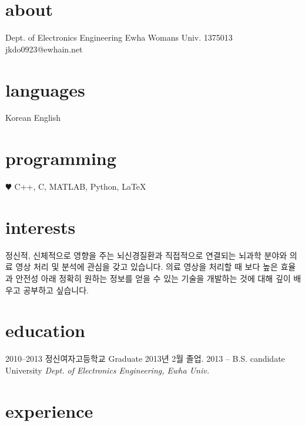 \documentclass[]{friggeri-cv}
\begin{document}


\begin{aside}
  \section{about}
    Dept. of Electronics
    Engineering
    Ewha Womans Univ.
    1375013
    ~
    jkdo0923@ewhain.net    
  \section{languages}
    Korean
    English
  \section{programming}
    {\color{red} $\varheartsuit$} C++, C, MATLAB, Python, \LaTeX{}
\end{aside}

\section{interests}

\hspace{0.3cm} 정신적, 신체적으로 영향을 주는 뇌신경질환과 직접적으로 연결되는 뇌과학 분야와 의료 영상 처리 및 분석에 관심을 갖고 있습니다. 의료 영상을 처리할 때 보다 높은 효율과 안전성 아래 정확히 원하는 정보를 얻을 수 있는 기술을 개발하는 것에 대해 깊이 배우고 공부하고 싶습니다.

\section{education}

\begin{entrylist}
  \entry
    {2010–2013}
    {정신여자고등학교}
    {Graduate}
    {2013년 2월 졸업.}
  \entry
    {2013 –}
    {B.S. candidate}
    {University}
    {\emph{Dept. of Electronics Engineering, Ewha Univ.}}
\end{entrylist}

\section{experience}
\end{document}
